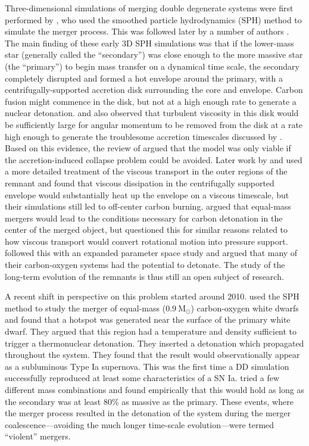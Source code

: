 \documentclass[iop]{../emulateapj}
\newcommand{\msolar}{\mathrm{M}_\odot}
\begin{document}
Three-dimensional simulations of merging double degenerate systems were 
first performed by \citet{benz:1990}, who used the smoothed particle
hydrodynamics (SPH) method to simulate the merger process. This was 
followed later by a number of authors 
\citep{rasio_shapiro:1995,segretain:1997,guerrero:2004,yoon:2007,loren-aguilar:2009,raskin:2012}.
The main finding of these early 3D SPH simulations was that if the 
lower-mass star (generally called the ``secondary'') was
close enough to the more massive star (the ``primary'') to begin mass
transfer on a dynamical time scale, the secondary completely disrupted
and formed a hot envelope around the primary, with a
centrifugally-supported accretion disk surrounding the core and
envelope. Carbon fusion might commence in the disk, but not at a 
high enough rate to generate a nuclear detonation. \cite{mochkovitch_livio:1990} 
and \cite{livio:2000}  also observed that turbulent viscosity in this disk 
would be sufficiently large for angular momentum to be removed from the 
disk at a rate high enough to generate the troublesome accretion 
timescales discussed by \cite{tutukov_yungelson:1979}. Based on this
evidence, the review of \cite{hillebrandtniemeyer2000} argued that the
model was only viable if the accretion-induced collapse problem could
be avoided. Later work by \cite{shen:2012} and \cite{schwab:2012} used
a more detailed treatment of the viscous transport in the outer
regions of the remnant and found that viscous dissipation in the centrifugally
supported envelope would substantially heat up the envelope on a  
viscous timescale, but their simulations still led to off-center carbon
burning. \cite{vankerkwijk:2010} argued that equal-mass mergers would
lead to the conditions necessary for carbon detonation in the center
of the merged object, but \cite{shen:2012} questioned this for similar
reasons related to how viscous transport would convert rotational
motion into pressure support. \cite{zhu:2013} followed this with an
expanded parameter space study and argued that many of their
carbon-oxygen systems had the potential to detonate. The study of the
long-term evolution of the remnants is thus still an open subject of
research.

A recent shift in perspective on this problem started around 2010.
\cite{pakmor:2010} used the SPH method to study the merger of 
equal-mass ($0.9\ \msolar$) carbon-oxygen white dwarfs and found 
that a hotspot was generated near the surface of the primary 
white dwarf. They argued that this region had a temperature 
and density sufficient to trigger a thermonuclear
detonation. They inserted a detonation which propagated throughout 
the system. They found that the result would observationally 
appear as a subluminous Type Ia supernova. This was the first time 
a DD simulation successfully reproduced at least some characteristics of a SN
Ia. \cite{pakmor:2011} tried a few different mass combinations and
found empirically that this would hold as long as the secondary was at
least 80\% as massive as the primary. These events, where the merger
process resulted in the detonation of the system during the merger
coalescence---avoiding the much longer time-scale evolution---were
termed ``violent'' mergers.
\end{document}
